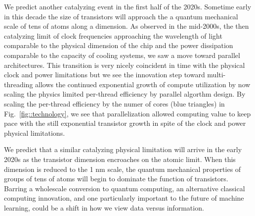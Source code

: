 \documentclass{article}
\begin{document}
We predict another catalyzing event in the first half of the 2020s.
Sometime early in this decade the size of transistors will approach the a quantum mechanical scale of tens of atoms along a dimension.
As observed in the mid-2000s, the then catalyzing limit of clock frequencies approaching the wavelength of light comparable to the physical dimension of the chip and the power dissipation comparable to the capacity of cooling systems, we saw a move toward parallel architectures. 
This transition is very nicely coincident in time with the physical clock and power limitations but we see the innovation step toward multi-threading allows the continued exponential growth of compute utilization by now scaling the physics limited per-thread efficiency by parallel algorthm design.
By scaling the per-thread efficiency by the numer of cores (blue triangles) in Fig.~\ref{fig::technology}, we see that parallelization allowed computing value to keep pace with the still exponential transistor growth in spite of the clock and power physical limitations.

We predict that a similar catalyzing physical limitation will arrive in the early 2020s as the transistor dimension encroaches on the atomic limit.
When this dimension is reduced to the 1 nm scale, the quantum mechanical properties of groups of tens of atoms will begin to dominate the function of transistors.
Barring a wholescale conversion to quantum computing, an alternative classical computing innovation, and one particularly important to the future of machine learning, could be a shift in how we view data versus information.
\end{document}
